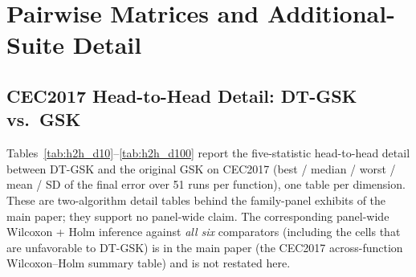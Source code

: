 \documentclass[algorithms,article,submit,moreauthors,pdftex]{Definitions/mdpi}
\newcommand{\dtgsk}{DT-GSK}
\newcommand{\apgsk}{APGSK}
\begin{document}
\begin{table}[p]
\caption{CEC2017 at $D = 50$: mean $\pm$ SD of the final error over 51
runs for all 7 GSK-family algorithms on each of the 29 functions (F1,
F3--F30; success floor $10^{-8}$); best mean per function in bold.
  \apgsk{} cells
derive from the final-checkpoint columns of the per-generation logs
(per-run file unavailable at this dimension at the analysis freeze;
recovered post-freeze, values unchanged; never
imputed).}\label{tab:cec2017-d50}
\centering
\tablesize{\footnotesize}
\resizebox{\textwidth}{!}{}
\end{table}

\begin{table}[p]
\caption{CEC2017 at $D = 100$: mean $\pm$ SD of the final error over 51
runs for all 7 GSK-family algorithms on each of the 29 functions (F1,
F3--F30; success floor $10^{-8}$); best mean per function in bold.
}\label{tab:cec2017-d100}
\centering
\tablesize{\footnotesize}
\resizebox{\textwidth}{!}{}
\end{table}

\section{Pairwise Matrices and Additional-Suite Detail}\label{sec:supp:pairwise}

\subsection{CEC2017 Head-to-Head Detail: \dtgsk{} vs.\ GSK}\label{sec:supp:h2h}

Tables~\ref{tab:h2h_d10}--\ref{tab:h2h_d100} report the five-statistic
head-to-head detail between \dtgsk{} and the original GSK on CEC2017
(best / median / worst / mean / SD of the final error over 51 runs per
function), one table per dimension.
These are two-algorithm detail tables behind the family-panel exhibits
of the main paper; they support no panel-wide claim.  The corresponding
panel-wide Wilcoxon + Holm inference against \emph{all six} comparators
(including the cells that are unfavorable to \dtgsk{}) is in the
main paper (the CEC2017 across-function Wilcoxon--Holm summary table) and is not restated here.
\end{document}
